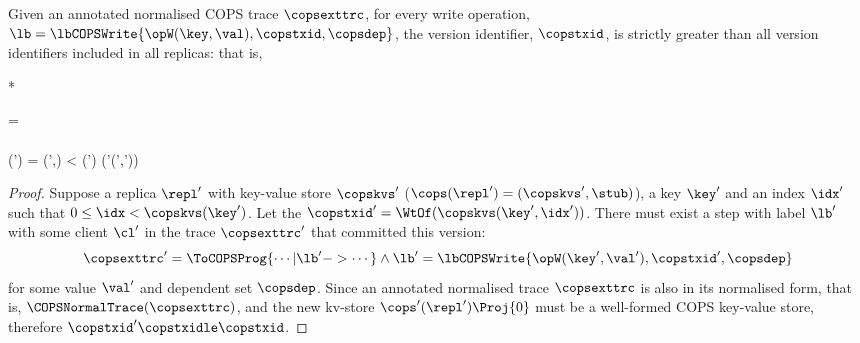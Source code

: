 \label{sec:proof-append-write-op}
\begin{proposition}
\label{prop:cops-append-write}
Given an annotated normalised COPS trace \( \copsexttrc \),
for every write operation, \( \lb = \lbCOPSWrite{\opW(\key,\val), \copstxid, \copsdep } \),
the version identifier, \(\copstxid \), is strictly greater than all version identifiers included in all replicas:
that is,
\begin{Formulae}*
\begin{Formula}
\copsexttrc = 
        \\ \land 
        \\ \cops(\repl') = (\copskvs',\stub)
         \leq \idx < \copskvs(\key')
        \implies  \WtOf(\copskvs'(\key',\idx')) \copstxidle \copstxid
\end{Formula}
\end{Formulae}
\end{proposition}
\begin{proof}
Suppose a replica \( \repl' \) with key-value store \( \copskvs' \) (\( \cops(\repl') = (\copskvs',\stub)\)), a key \( \key' \)
and an index \( \idx' \) such that \( 0 \leq \idx < \copskvs(\key') \).
Let the \( \copstxid' = \WtOf(\copskvs(\key',\idx'))\).
There must exist a step with label \( \lb' \) with some client \( \cl' \)
in the trace \( \copsexttrc' \) that committed this version:
\[ 
\copsexttrc' = \ToCOPSProg{ \cdots | \lb' -> \cdots }
\land \lb' = \lbCOPSWrite{\opW(\key',\val'), \copstxid', \copsdep } 
\]
for some value \( \val ' \) and dependent set \(\copsdep \).
Since an annotated normalised trace \( \copsexttrc \) is also in its normalised form, that is, \( \COPSNormalTrace(\copsexttrc) \),
and the new kv-store \( \cops'(\repl')\Proj{0} \) must be a well-formed COPS key-value store,
therefore \( \copstxid' \copstxidle \copstxid \).
\end{proof}
